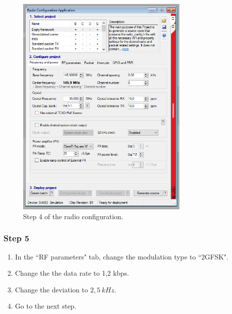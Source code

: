 \begin{figure}[!h]
	\begin{center}
		\includegraphics[width=0.75\textwidth]{figures/wds-tutorial/wds-tutorial-4.png}
		\caption{Step 4 of the radio configuration.}
		\label{fig:wds-tutorial-step-4}
	\end{center}
\end{figure}

\subsubsection{Step 5}

\begin{enumerate}
    \item In the ``RF parameters" tab, change the modulation type to ``2GFSK".
    \item Change the the data rate to 1,2 kbps.
    \item Change the deviation to $2,5\ kHz$.
    \item Go to the next step.
\end{enumerate}

